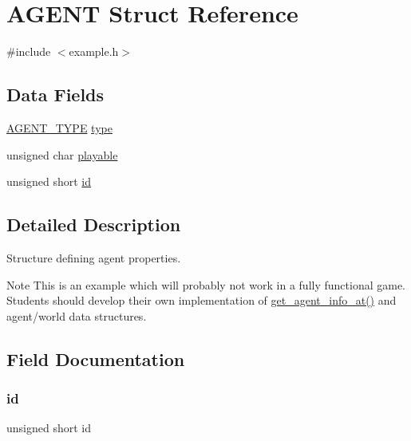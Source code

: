 \hypertarget{struct_a_g_e_n_t}{}\section{A\+G\+E\+NT Struct Reference}
\label{struct_a_g_e_n_t}


{\ttfamily \#include $<$example.\+h$>$}

\subsection*{Data Fields}
\begin{DoxyCompactItemize}
\item 
\mbox{\hyperlink{showworld_8h_a24d5ee52bdf31f4727c9b550d6e361ae}{A\+G\+E\+N\+T\+\_\+\+T\+Y\+PE}} \mbox{\hyperlink{struct_a_g_e_n_t_aa67ea80f7f0c5d71eaa7fe3ce7d31cc9}{type}}
\item 
unsigned char \mbox{\hyperlink{struct_a_g_e_n_t_a63b583a476b62c88c27c5cfc6ee64e41}{playable}}
\item 
unsigned short \mbox{\hyperlink{struct_a_g_e_n_t_a2e74aff868562e644e5d582929433363}{id}}
\end{DoxyCompactItemize}


\subsection{Detailed Description}
Structure defining agent properties.

\begin{DoxyNote}{Note}
This is an example which will probably not work in a fully functional game. Students should develop their own implementation of \mbox{\hyperlink{showworld_8h_aa7881dde0e99af6e6576a7401f3c4586}{get\+\_\+agent\+\_\+info\+\_\+at()}} and agent/world data structures. 
\end{DoxyNote}


\subsection{Field Documentation}
\mbox{\label{struct_a_g_e_n_t_a2e74aff868562e644e5d582929433363}} 
\subsubsection{\texorpdfstring{id}{id}}
{\footnotesize\ttfamily unsigned short id}

